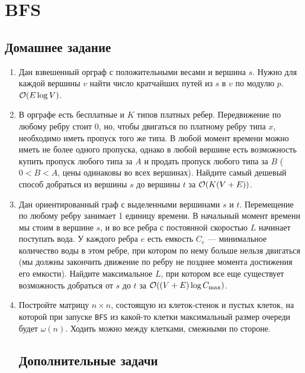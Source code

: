 \section{BFS}

\subsection{Домашнее задание}
\begin{enumerate}
  \item
    Дан взвешенный орграф с положительными весами и вершина $s$.
    Нужно для каждой вершины $v$ найти число кратчайших путей из $s$ в $v$ по модулю $p$. $\mathcal{O}(E \log V)$.

  \item
    В орграфе есть бесплатные и $K$ типов платных ребер. Передвижение
    по любому ребру стоит $0$, но, чтобы двигаться по платному ребру
    типа $x$, необходимо иметь пропуск того же типа. В любой момент
    времени можно иметь не более одного пропуска, однако в любой
    вершине есть возможность купить пропуск любого типа за $A$ и
    продать пропуск любого типа за $B$ ($0 < B < A$, цены одинаковы
    во всех вершинах). Найдите самый дешевый способ добраться из вершины
    $s$ до вершины $t$ за $\mathcal{O}(K (V + E))$.

  \item
    Дан ориентированный граф с выделенными вершинами $s$ и $t$. Перемещение по любому ребру занимает 1 единицу времени.
    В начальный момент времени мы стоим в вершине $s$, и во все ребра с постоянной скоростью $L$ начинает поступать вода.
    У каждого ребра $e$ есть емкость $C_e$ --- минимальное количество воды в этом ребре, при котором по нему больше
    нельзя двигаться (мы должны закончить движение по ребру не позднее момента достижения его емкости). Найдите
    максимальное $L$, при котором все еще существует возможность добраться от $s$ до $t$ за $\mathcal{O}((V + E)\log{C_{\max}})$.

  \item
    Постройте матрицу $n \times n$, состоящую из клеток-стенок и пустых клеток,
    на которой при запуске \texttt{BFS} из какой-то клетки максимальный
    размер очереди будет $\omega(n)$. Ходить можно между клетками, смежными по стороне.

\subsection*{Дополнительные задачи}


\end{enumerate}
